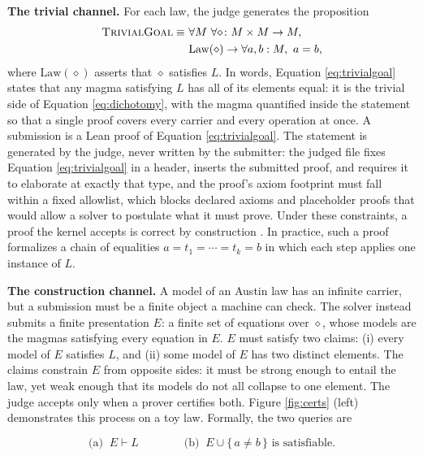 \documentclass[letterpaper]{article} %
\newcommand{\op}{\diamond}
\begin{document}
\textbf{The trivial channel.} For each law, the judge generates the proposition
\begin{equation}\label{eq:trivialgoal}
\begin{split}
\textsc{TrivialGoal} \equiv\ &\forall M\ \forall {\op}\colon M \times M \to M,\\
&\mathrm{Law}(\op) \rightarrow \forall a, b : M,\ a = b,
\end{split}
\end{equation}
where $\mathrm{Law}(\op)$ asserts that $\op$ satisfies $L$. In words, Equation \eqref{eq:trivialgoal} states that any magma satisfying $L$ has all of its elements equal: it is the trivial side of Equation \eqref{eq:dichotomy}, with the magma quantified inside the statement so that a single proof covers every carrier and every operation at once. A submission is a Lean proof of Equation \eqref{eq:trivialgoal}. The statement is generated by the judge, never written by the submitter: the judged file fixes Equation \eqref{eq:trivialgoal} in a header, inserts the submitted proof, and requires it to elaborate at exactly that type, and the proof's axiom footprint must fall within a fixed allowlist, which blocks declared axioms and placeholder proofs that would allow a solver to postulate what it must prove. Under these constraints, a proof the kernel accepts is correct by construction \citep{moura2021lean}. In practice, such a proof formalizes a chain of equalities $a = t_1 = \cdots = t_k = b$ in which each step applies one instance of $L$.

\textbf{The construction channel.} A model of an Austin law has an infinite carrier, but a submission must be a finite object a machine can check. The solver instead submits a finite presentation $E$: a finite set of equations over $\op$, whose models are the magmas satisfying every equation in $E$. $E$ must satisfy two claims: (i) every model of $E$ satisfies $L$, and (ii) some model of $E$ has two distinct elements. The claims constrain $E$ from opposite sides: it must be strong enough to entail the law, yet weak enough that its models do not all collapse to one element. The judge accepts only when a prover certifies both. Figure \ref{fig:certs} (left) demonstrates this process on a toy law. Formally, the two queries are

\begin{equation}\label{eq:construction}
\text{(a)}\;\; E \vdash L
\qquad\qquad
\text{(b)}\;\; E \cup \{\,a \neq b\,\} \text{ is satisfiable.}
\end{equation}
\end{document}

